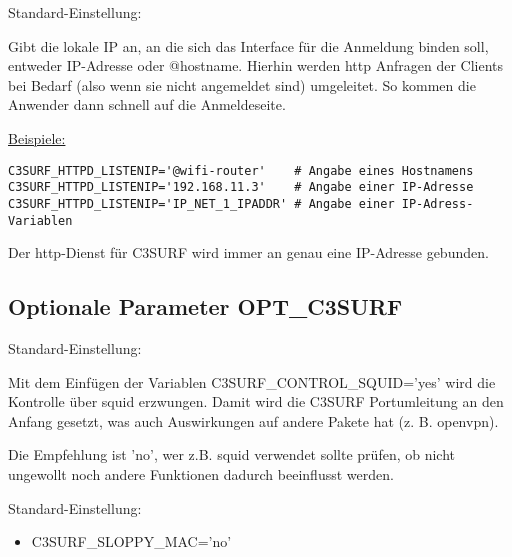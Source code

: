 \begin{itemize}
\begin{description}

  Standard-Einstellung: 

  Gibt die lokale IP an, an die sich das Interface für die Anmeldung binden soll,
  entweder IP-Adresse oder @hostname. Hierhin werden http Anfragen der Clients bei
  Bedarf (also wenn sie nicht angemeldet sind) umgeleitet. So
  kommen die Anwender dann schnell auf die Anmeldeseite.

\underline{Beispiele:}
\begin{example}
\begin{verbatim}
C3SURF_HTTPD_LISTENIP='@wifi-router'    # Angabe eines Hostnamens
C3SURF_HTTPD_LISTENIP='192.168.11.3'    # Angabe einer IP-Adresse
C3SURF_HTTPD_LISTENIP='IP_NET_1_IPADDR' # Angabe einer IP-Adress-Variablen
\end{verbatim}
\end{example}

Der http-Dienst für C3SURF wird immer an genau eine IP-Adresse gebunden.

\end{description}

\subsection {Optionale Parameter OPT\_C3SURF}

\begin{description}


  Standard-Einstellung: 

  Mit dem Einfügen der Variablen C3SURF\_CONTROL\_SQUID='yes' wird die
  Kontrolle über squid erzwungen. Damit wird die C3SURF Portumleitung an den
  Anfang gesetzt, was auch Auswirkungen auf andere Pakete hat (z. B. openvpn).

  Die Empfehlung ist 'no', wer z.B. squid verwendet sollte prüfen, ob nicht
  ungewollt noch andere Funktionen dadurch beeinflusst werden.

  
  Standard-Einstellung: 
  
   \begin{itemize}
      \item{C3SURF\_SLOPPY\_MAC='no'}
      

\end{itemize}
\end{description}
\end{itemize}
